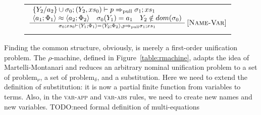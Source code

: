 \documentclass[a4paper,UKenglish]{lipics-v2016}
\makeatletter
\newenvironment*{premises}{\begin{array}{@{}l@{}}}{\end{array}}
\newcommand*{\infrule}[2]{\frac{\hspace{1ex}\vphantom{()}#1\hspace{1ex}}{\hspace{1ex}\vphantom{()}#2\hspace{1ex}}}
\newcommand*{\RNAME}[1]{\,\ensuremath{\textsc{[#1]}}}
\newcommand{\clos}[2] {
  \langle #1; #2 \rangle
}
\newcommand{\pframe}[5] {
  #1; #2 \vdash #3 \Rightarrow_\textrm{pull} #4; #5
}
\newcommand{\eq}[2] {
 #1 = #2
}
\newcommand{\aeq}[4] {
  \clos{#1}{#2} \approx \clos{#3}{#4}
}
\newcommand*{\transname}[1]{\textsc{#1}}
\makeatother
\begin{document}
\begin{figure}[htbp]
\begin{minipage}[b]{0.4\textwidth}
\begin{tabular}{l}
    $\infrule{%
        \begin{premises}
              \pframe{\{Y_2/a_2\}\cup\sigma_0}{(Y_2, xs_0)}{p}{\sigma_1}{xs_1}  \\
    \aeq{a_1}{\Phi_1}{a_2}{\Phi_2} \quad \sigma_0(Y_1) = a_1 \quad Y_2\notin dom(\sigma_0)
    \end{premises}
    }{\pframe{\sigma_0}{xs_0}{\eq{\clos{Y_1}{\Phi_1}}{\clos{Y_2}{\Phi_2}}, p}{\sigma_1}{xs_1}}
    \RNAME{Name-Var}$ \\ \\


\end{tabular}

\end{minipage}
\end{figure}

Finding the common structure, obviously, is merely a first-order
unification problem.  The $\rho$-machine, defined in
Figure~\ref{table:rmachine}, adapts the idea of Martelli-Montanari and
reduces an arbitrary nominal unification problem to a set of
problem$_\nu$, a set of problem$_\delta$, and a substitution.  Here we
need to extend the definition of substitution: it is now a partial
finite function from variables to terms.  Also, in the
\transname{var-app} and \transname{var-abs} rules, we need to create
new names and new variables.
{\color{red} TODO:need formal definition of multi-equations}
\end{document}
